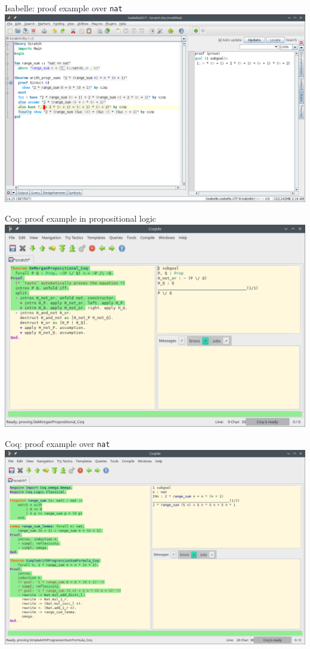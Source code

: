 \documentclass[aspectratio=169, fleqn]{beamer}
\begin{document}
\begin{frame}{Isabelle: proof example over \texttt{nat}}
\includegraphics[scale=0.39]{img/isabelle_arith.png}
\end{frame}



\begin{frame}
{Coq: proof example in propositional logic}
\includegraphics[scale=0.42]{img/coq_morgan.png}
\end{frame}

\begin{frame}{Coq: proof example over \texttt{nat}}
\includegraphics[scale=0.39]{img/gif-coq/coq-arith-6.png}
\end{frame}
\end{document}
